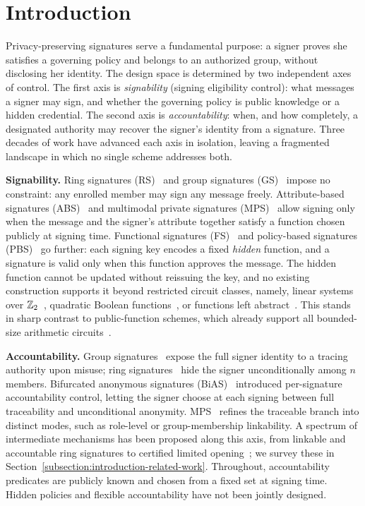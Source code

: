 \section{Introduction}\label{section:introduction}
Privacy-preserving signatures serve a fundamental purpose:
a signer proves she satisfies a governing policy and belongs to an authorized group,
without disclosing her identity.
The design space is determined by two independent axes of control.
The first axis is \emph{signability} (signing eligibility control):
what messages a signer may sign,
and whether the governing policy is public knowledge or a hidden credential.
The second axis is \emph{accountability}: when, and how completely,
a designated authority may recover the signer's identity from a signature.
Three decades of work have advanced each axis in isolation,
leaving a fragmented landscape in which no single scheme addresses both.

\medskip
\noindent\textbf{Signability.}
Ring signatures (RS)~\cite{TCC:BenKatMor06,AC:RivShaTau01} and
group signatures (GS)~\cite{EC:ChaVan91,KiayiasY06} impose no constraint:
any enrolled member may sign any message freely.
Attribute-based signatures (ABS)~\cite{RSA:MajPraRos11} and
multimodal private signatures (MPS)~\cite{CRYPTO:NGSY22} allow signing only when the message and the signer's attribute
together satisfy a function chosen publicly at signing time.
Functional signatures (FS)~\cite{PKC:BoyGolIva14} and
policy-based signatures (PBS)~\cite{PKC:BelFuc14} go further:
each signing key encodes a fixed \emph{hidden} function,
and a signature is valid only when this function approves the message.
The hidden function cannot be updated without reissuing the key,
and no existing construction supports it beyond restricted circuit classes,
namely, linear systems over $\mathbb{Z}_2$~\cite{ChengNW16,XuSNW22},
quadratic Boolean functions~\cite{ACISP:TNLPS24},
or functions left abstract~\cite{PKC:BoyGolIva14,GuoHMXYS21}.
This stands in sharp contrast to public-function schemes,
which already support all bounded-size arithmetic circuits~\cite{PKC:LNPTWX24,SCN:Sakai22}.

\medskip
\noindent\textbf{Accountability.}
Group signatures~\cite{EC:ChaVan91} expose the full signer identity to a tracing authority upon misuse;
ring signatures~\cite{AC:RivShaTau01} hide the signer unconditionally among $n$ members.
Bifurcated anonymous signatures (BiAS)~\cite{EC:LNPY21} introduced per-signature accountability control,
letting the signer choose at each signing between full traceability and unconditional anonymity.
MPS~\cite{CRYPTO:NGSY22} refines the traceable branch into distinct modes,
such as role-level or group-membership linkability.
A spectrum of intermediate mechanisms has been proposed along this axis,
from linkable and accountable ring signatures to certified limited opening~\cite{SAC:Chow09,VIETCRYPT:ChowSusYue06,FC:ChowZhaZha17,ESORICS:LaZhChowSch16,CARDIS:XuYun04,RSA:ZhaWuChow19};
we survey these in Section~\ref{subsection:introduction-related-work}.
Throughout, accountability predicates are publicly known and chosen from a fixed set at signing time.
Hidden policies and flexible accountability have not been jointly designed.

